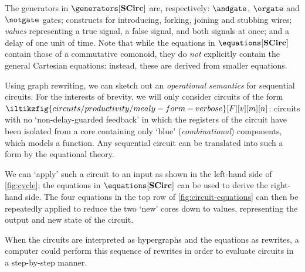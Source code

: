 



The generators in \(\generators[\mathbf{SCirc}]\) are, respectively:
\(\andgate\), \(\orgate\) and \(\notgate\) gates; constructs for introducing,
forking, joining and stubbing wires; \emph{values} representing a true signal,
a false signal, and both signals at once; and a delay of one unit of time.
Note that while the equations in \(\equations[\mathbf{SCirc}]\) contain those
of a commutative comonoid, they do \emph{not} explicitly contain the general
Cartesian equations: instead, these are derived from smaller equations.

Using graph rewriting, we can sketch out an \emph{operational semantics} for
sequential circuits.
For the interests of brevity, we will only consider circuits of the form \(
    \iltikzfig{circuits/productivity/mealy-form-verbose}[F][v][m][n]
\): circuits with no `non-delay-guarded feedback' in which the registers of the
circuit have been isolated from a core containing only `blue'
(\emph{combinational}) components, which models a function.
Any sequential circuit can be translated into such a form by the equational
theory.

We can `apply' such a circuit to an input as shown in the left-hand side of
\cref{fig:cycle}; the equations in
\(\equations[\mathbf{SCirc}]\) can be used to derive the right-hand side.
The four equations in the top row of \cref{fig:circuit-equations} can then be
repeatedly applied to reduce the two `new' cores down to values, representing
the output and new state of the circuit.

When the circuits are interpreted as hypergraphs and the equations as rewrites,
a computer could perform this sequence of rewrites in order to evaluate circuits
in a step-by-step manner.
